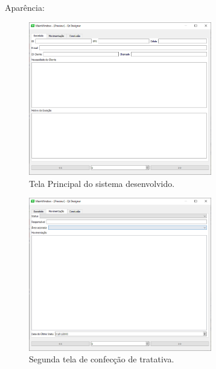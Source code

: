 \documentclass[12pt,a4paper,oneside,sumario=tradicional,brazil]{abntex2}
\begin{document}
	Aparência: \\
	\begin{minipage}{\linewidth}
		\centering
		\begin{minipage}{0.45\linewidth}
			\begin{figure}[H]
				\centering
				\includegraphics[width=8cm]{imgs/pagtrativa.png}
				\caption{Tela Principal do sistema desenvolvido.}
			\end{figure}
		\end{minipage}
		\hspace{0.05\linewidth}
		\begin{minipage}{0.45\linewidth}
			\begin{figure}[H]
				\includegraphics[width=8cm]{imgs/pagtrativatab2.png}
				\caption{Segunda tela de confecção de tratativa.}
			\end{figure}
		\end{minipage}
	\end{minipage} \\
	
	\
	
\end{document}
